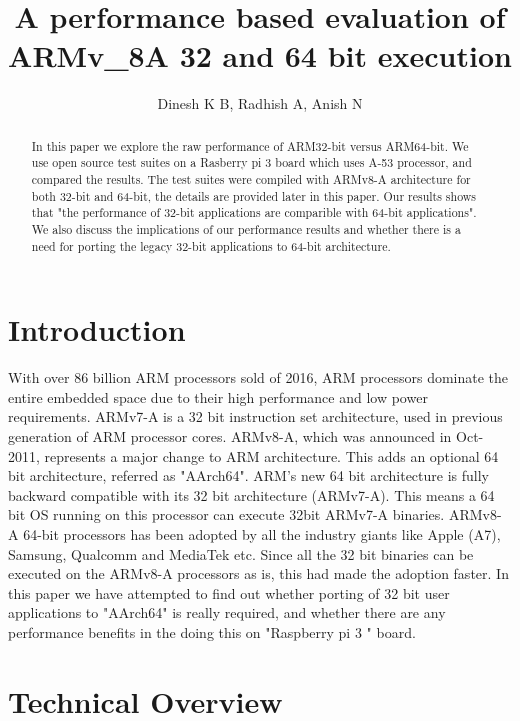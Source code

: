 \documentclass[journal]{IEEEtran}
\begin{document}
\title{A performance based evaluation of ARMv\_8A 32 and 64 bit execution}
\author{Dinesh K B, Radhish A, Anish N}

\maketitle

\begin{abstract}
In this paper we explore the raw performance of ARM32-bit versus ARM64-bit.  We use open source test suites on a Rasberry pi 3 board which uses A-53 processor, and compared the results.  The test suites were compiled with ARMv8-A architecture for both 32-bit and 64-bit, the details are provided later in this paper.  Our results shows that "the performance of 32-bit applications are comparible with 64-bit applications".  We also discuss the implications of our performance results and whether there is a need for porting the legacy 32-bit applications to 64-bit architecture.
\end{abstract}

\section{Introduction}
With over 86 billion ARM processors sold of 2016, ARM processors dominate the entire embedded space due to their high performance and low power requirements.  ARMv7-A is a 32 bit instruction set architecture, used in previous generation of ARM processor cores.  ARMv8-A, which was announced in Oct-2011, represents a major change to ARM architecture.  This adds an optional 64 bit architecture, referred as "AArch64". ARM's new 64 bit architecture is fully backward compatible with its 32 bit architecture (ARMv7-A). This means a 64 bit OS running on this processor can execute 32bit ARMv7-A binaries.  ARMv8-A 64-bit processors has been adopted by all the industry giants like Apple (A7), Samsung, Qualcomm and MediaTek etc.  Since all the 32 bit binaries can be executed on the ARMv8-A processors as is, this had made the adoption faster.  In this paper we have attempted to find out whether porting of 32 bit user applications to "AArch64" is really required, and whether there are any performance benefits in the doing this on "Raspberry pi 3 " board.


\section{Technical Overview}
\end{document}
